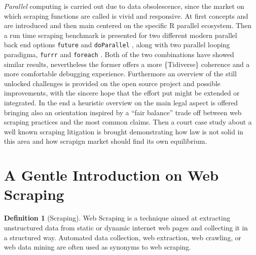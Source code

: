 \documentclass[
  12pt,
  a4paper,
  oneside]{book}
\newcommand{\passthrough}[1]{#1}
\theoremstyle{definition}
\newtheorem{definition}{Definition}[chapter]
\theoremstyle{definition}
\theoremstyle{definition}
\theoremstyle{remark}
\begin{document}
\emph{Parallel} computing is carried out due to data obsolescence, since the market on which scraping functions are called is vivid and responsive. At first concepts and are introduced and then main centered on the specific R parallel ecosystem. Then a run time scraping benchmark is presented for two different modern parallel back end options \passthrough{\lstinline!future!} \citet{future} and \passthrough{\lstinline!doParallel!} \citet{doParallel}, along with two parallel looping paradigma, \passthrough{\lstinline!furrr!} \citet{furrr} and \passthrough{\lstinline!foreach!} \citet{foreach}. Both of the two combinations have showed similar results, nevertheless the former offers a more \{Tidiverse\} coherence and a more comfortable debugging experience.
Furthermore an overview of the still unlocked challenges is provided on the open source project and possible improvements, with the sincere hope that the effort put might be extended or integrated. In the end a heuristic overview on the main legal aspect is offered bringing also an orientation inspired by a ``fair balance'' trade off between web scraping practices and the most common claims. Then a court case study about a well known scraping litigation is brought demonstrating how law is not solid in this area and how scrapign market should find its own equilibrium.

\hypertarget{reverse}{%
\section{A Gentle Introduction on Web Scraping}\label{reverse}}

\begin{definition}[Scraping]
\protect\hypertarget{def:scraping}{}{\label{def:scraping} {} }Web Scraping is a technique aimed at extracting unstructured data from static or dynamic internet web pages and collecting it in a structured way.
Automated data collection, web extraction, web crawling, or web data mining are often used as synonyms to web scraping.
\end{definition}
\end{document}
